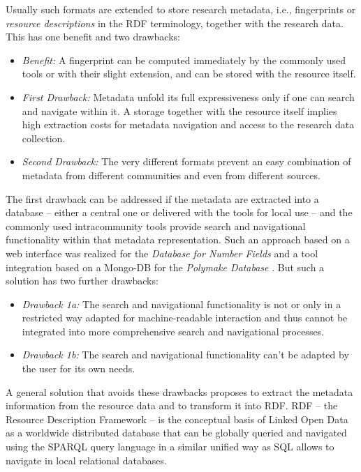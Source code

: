 \documentclass[runningheads,a4paper]{llncs}
\begin{document}
Usually such formats are extended to store research metadata, i.e.,
fingerprints or \emph{resource descriptions} in the RDF terminology, together
with the research data. This has one benefit and two drawbacks:
\begin{itemize}
\item \emph{Benefit:} A fingerprint can be computed immediately by the commonly
  used tools or with their slight extension, and can be stored with the
  resource itself.
\item \emph{First Drawback:} Metadata unfold its full expressiveness only if
  one can search and navigate within it. A storage together with the resource
  itself implies high extraction costs for metadata navigation and access to
  the research data collection. 
\item \emph{Second Drawback:} The very different formats prevent an easy
  combination of metadata from different communities and even from different
  sources.
\end{itemize}
The first drawback can be addressed if the metadata are extracted into a
data\-base -- either a central one or delivered with the tools for local use --
and the commonly used intracommunity tools provide search and navigational
functionality within that metadata representation. Such an approach based on a
web interface was realized for the \emph{Database for Number Fields}
\cite{MalleKlueners} and a tool integration based on a Mongo-DB for the
\emph{Polymake Database} \cite{polymake}.  But such a solution has two further
drawbacks:
\begin{itemize}
\item \emph{Drawback 1a:} The search and navigational functionality is not or
  only in a restricted way adapted for machine-readable interaction and thus
  cannot be integrated into more comprehensive search and navigational
  processes.
\item \emph{Drawback 1b:} The search and navigational functionality can't be
  adapted by the user for its own needs.
\end{itemize}
A general solution that avoids these drawbacks proposes to extract the metadata
information from the resource data and to transform it into RDF.  RDF -- the
Resource Description Framework -- is the conceptual basis of Linked Open Data
as a worldwide distributed database that can be globally queried and
navi\-gated using the SPARQL query language in a similar unified way as SQL
allows to navigate in local relational databases.
\medskip
\end{document}
